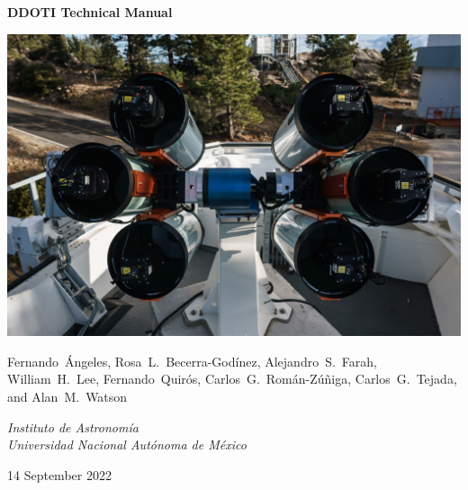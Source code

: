 \begin{centering}
{
 \Large
 \bfseries 
 DDOTI Technical Manual
 \par
}
\bigskip
\bigskip
\includegraphics[width=\linewidth]{figures/frontmatter-ddoti.jpg}

\bigskip
\bigskip
{
\baselineskip=10pt
 \large
 Fernando~Ángeles,
 Rosa~L.~Becerra-Godínez,
 Alejandro~S.~Farah,
 William~H.~Lee,
 Fernando~Quirós,
 Carlos~G.~Román-Zúñiga,
 Carlos~G.~Tejada,
 and
 Alan~M.~Watson
 \par
}
\bigskip
{
 \large
 \itshape 
 Instituto de Astronomía\\
 Universidad Nacional Autónoma de México
 \par
}
\bigskip
{
 \large
 14 September 2022
}
\fi

\end{centering}

\newpage

\pagestyle{plain}


\tableofcontents

